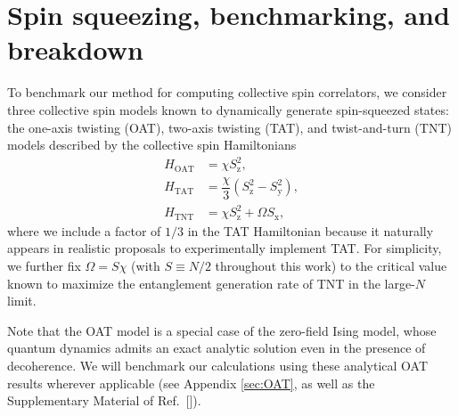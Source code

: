 \documentclass[pra,reprint,longbibliography]{revtex4-1}
\renewcommand{\t}{\text} %
\newcommand{\f}[2]{\dfrac{#1}{#2}} %
\newcommand{\p}[1]{\left(#1\right)} %
\newcommand{\z}{\text{z}}
\newcommand{\x}{\text{x}}
\newcommand{\y}{\text{y}}
\newcommand{\1}{\mathds{1}}
\begin{document}
\section{Spin squeezing, benchmarking, and breakdown}

To benchmark our method for computing collective spin correlators, we
consider three collective spin models known to dynamically generate
spin-squeezed states: the one-axis twisting (OAT), two-axis twisting
(TAT), and twist-and-turn (TNT) models described by the collective
spin Hamiltonians\cite{kitagawa1993squeezed, micheli2003manyparticle}
\begin{align}
  \label{eq:OAT}
  H_{\t{OAT}} &= \chi S_\z^2, \\
  \label{eq:TAT}
  H_{\t{TAT}} &= \f{\chi}{3} \p{S_\z^2 - S_\y^2}, \\
  \label{eq:TNT}
  H_{\t{TNT}} &= \chi S_\z^2 + \Omega S_\x,
\end{align}
where we include a factor of $1/3$ in the TAT Hamiltonian because it
naturally appears in realistic proposals to experimentally implement
TAT\cite{liu2011spin, huang2015twoaxis}.  For simplicity, we further
fix $\Omega=S\chi$ (with $S\equiv N/2$ throughout this work) to the
critical value known to maximize the entanglement generation rate of
TNT in the large-$N$ limit\cite{micheli2003manyparticle,
  sorelli2015fast}.

Note that the OAT model is a special case of the zero-field Ising
model, whose quantum dynamics admits an exact analytic solution even
in the presence of decoherence\cite{foss-feig2013nonequilibrium}.  We
will benchmark our calculations using these analytical OAT results
wherever applicable (see Appendix \ref{sec:OAT}, as well as the
Supplementary Material of Ref.~[]).
\end{document}
